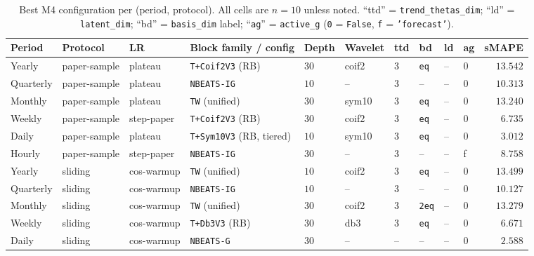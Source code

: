\documentclass[11pt,a4paper]{article}
\begin{document}
\begin{table}[h]
\centering
\scriptsize
\caption{Best M4 configuration per (period, protocol). All cells are $n=10$ unless noted. ``ttd'' = \texttt{trend\_thetas\_dim}; ``ld'' = \texttt{latent\_dim}; ``bd'' = \texttt{basis\_dim} label; ``\texttt{ag}'' = \texttt{active\_g} (\texttt{0} = \texttt{False}, \texttt{f} = \texttt{'forecast'}).}
\label{tab:quickpick}
\begin{tabular}{@{}llllllllllr@{}}
\toprule
Period & Protocol & LR & Block family / config & Depth & Wavelet & ttd & bd & ld & ag & sMAPE \\
\midrule
Yearly    & paper-sample & plateau    & \texttt{T+Coif2V3} (RB)             & $30$ & coif2 & $3$ & \texttt{eq}    & --   & 0 & $13.542$ \\
Quarterly & paper-sample & plateau    & \texttt{NBEATS-IG}                  & $10$ & --    & $3$ & --             & --   & 0 & $10.313$ \\
Monthly   & paper-sample & plateau    & \texttt{TW} (unified)               & $30$ & sym10 & $3$ & \texttt{eq}    & --   & 0 & $13.240$ \\
Weekly    & paper-sample & step-paper & \texttt{T+Coif2V3} (RB)             & $30$ & coif2 & $3$ & \texttt{eq}    & --   & 0 & $\phantom{0}6.735$ \\
Daily     & paper-sample & plateau    & \texttt{T+Sym10V3} (RB, tiered)     & $10$ & sym10 & $3$ & \texttt{eq}    & --   & 0 & $\phantom{0}3.012$ \\
Hourly    & paper-sample & step-paper & \texttt{NBEATS-IG}                  & $30$ & --    & $3$ & --             & --   & f & $\phantom{0}8.758$ \\
\midrule
Yearly    & sliding      & cos-warmup & \texttt{TW} (unified)               & $10$ & coif2 & $3$ & \texttt{eq}    & --   & 0 & $13.499$ \\
Quarterly & sliding      & cos-warmup & \texttt{NBEATS-IG}                  & $10$ & --    & $3$ & --             & --   & 0 & $10.127$ \\
Monthly   & sliding      & cos-warmup & \texttt{TW} (unified)               & $30$ & coif2 & $3$ & \texttt{2eq}   & --   & 0 & $13.279$ \\
Weekly    & sliding      & cos-warmup & \texttt{T+Db3V3} (RB)               & $30$ & db3   & $3$ & \texttt{eq}    & --   & 0 & $\phantom{0}6.671$ \\
Daily     & sliding      & cos-warmup & \texttt{NBEATS-G}                   & $30$ & --    & --  & --             & --   & 0 & $\phantom{0}2.588$ \\

\end{tabular}
\end{table}
\end{document}
